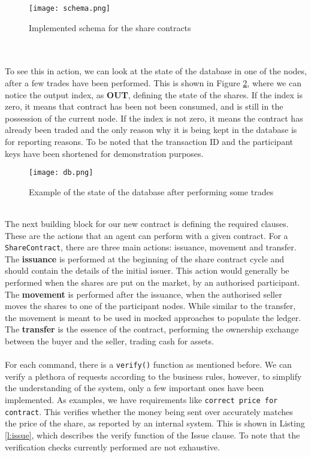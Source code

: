 \documentclass[12pt,twoside]{article}
\begin{document}
\begin{figure}[!htb]
\centering
\texttt{[image: schema.png]}
\caption{Implemented schema for the share contracts}
\centering
\label{fig:schema}
\end{figure}
\\ \\
To see this in action, we can look at the state of the database in one of the nodes, after a few trades have been performed. This is shown in Figure \ref{fig:db}, where we can notice the output index, as \textbf{OUT}, defining the state of the shares. If the index is zero, it means that contract has been not been consumed, and is still in the possession of the current node. If the index is not zero, it means the contract has already been traded and the only reason why it is being kept in the database is for reporting reasons. To be noted that the transaction ID and the participant keys have been shortened for demonstration purposes.
\begin{figure}[!htb]
\centering
\texttt{[image: db.png]}
\caption{Example of the state of the database after performing some trades}
\centering
\label{fig:db}
\end{figure} 
\\
The next building block for our new contract is defining the required clauses. These are the actions that an agent can perform with a given contract. For a \verb|ShareContract|, there are three main actions: issuance, movement and transfer. The \textbf{issuance} is performed at the beginning of the share contract cycle and should contain the details of the initial issuer. This action would generally be performed when the shares are put on the market, by an authorised participant. The \textbf{movement} is performed after the issuance, when the authorised seller moves the shares to one of the participant nodes. While similar to the transfer, the movement is meant to be used in mocked approaches to populate the ledger. The \textbf{transfer} is the essence of the contract, performing the ownership exchange between the buyer and the seller, trading cash for assets.
\\ \\
For each command, there is a \verb|verify()| function as mentioned before. We can verify a plethora of requests according to the business rules, however, to simplify the understanding of the system, only a few important ones have been implemented. As examples, we have requirements like \verb|correct price for contract|. This verifies whether the money being sent over accurately matches the price of the share, as reported by an internal system. This is shown in Listing \ref{l:issue}, which describes the verify function of the Issue clause. To note that the verification checks currently performed are not exhaustive.
\end{document}
